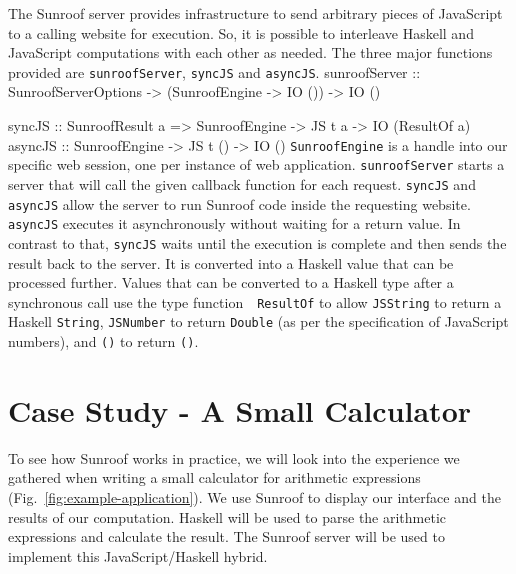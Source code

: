 \documentclass{llncs}
\newcommand{\Src}[1]{{\tt{#1}}}
\newenvironment{Code}{\verbatim}{\endverbatim}
\newcommand{\FigRef}[1]{Fig.~\ref{#1}}
\begin{document}
The Sunroof server provides infrastructure to send arbitrary pieces 
of JavaScript to a calling website for execution. 
So, it is possible to interleave Haskell and JavaScript 
computations with each other as needed. The three major functions
provided are \Src{sunroofServer}, \Src{syncJS} and \Src{asyncJS}.
\begin{Code}
sunroofServer :: SunroofServerOptions 
              -> (SunroofEngine -> IO ()) 
              -> IO ()

syncJS  :: SunroofResult a 
        => SunroofEngine -> JS t a -> IO (ResultOf a)
asyncJS :: SunroofEngine -> JS t () -> IO ()
\end{Code}
\Src{SunroofEngine} is a handle into our specific web session, one per instance of web application.
\Src{sunroofServer} starts a server that will call the given callback function
for each request.
\Src{syncJS} and \Src{asyncJS} allow the server
to run Sunroof code inside the requesting website.
\Src{asyncJS} executes it asynchronously without 
waiting for a return value. In contrast to that, 
\Src{syncJS} waits until the execution is complete and
then sends the result back to the server. It
is converted into a Haskell value that can be processed further. 
Values that can be converted to a Haskell type after a synchronous
call use the type function~\cite{..}~\Src{ResultOf} to
allow \Src{JSString} to return a Haskell \Src{String}, 
\Src{JSNumber} to return \Src{Double} (as per the specification
of JavaScript numbers), and \Src{()} to return \Src{()}.

\section{Case Study - A Small Calculator}
\label{sec:extended-example}

To see how Sunroof works in practice, we will look into the 
experience we gathered when writing a small calculator
for arithmetic expressions (\FigRef{fig:example-application}). 
We use Sunroof to display our interface
and the results of our computation. Haskell will be used to parse the 
arithmetic expressions and calculate the result. The Sunroof server 
will be used to implement this JavaScript/Haskell hybrid.
\end{document}
